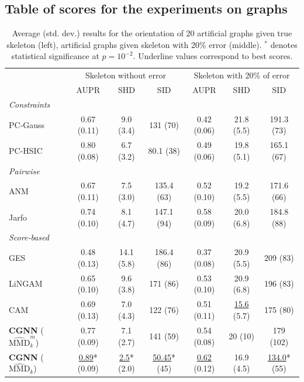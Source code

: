 \documentclass[a4paper, 11pt]{article}
\begin{document}
\subsection{Table of scores for the experiments on graphs}



\begin{table}[h!]
  \caption{Average (std. dev.) results for the orientation of 20 artificial graphs given true skeleton (left), artificial graphs given skeleton with 20\% error (middle). $^*$ denotes statistical significance at $p=10^{-2}$. Underline values correspond to best scores.}
  \footnotesize
  \hspace*{-1.5cm}
    \centering
  \begin{tabular}{l|ccc|ccc|}
    \toprule
     &  \multicolumn{3}{c}{Skeleton without error} & \multicolumn{3}{c}{Skeleton with 20\% of error} \\
      & AUPR & SHD & SID & AUPR & SHD & SID  \\
    \midrule
    \textit{Constraints}\\
    PC-Gauss & 0.67 (0.11) & 9.0 (3.4) & 131 (70) & 0.42 (0.06) & 21.8 (5.5) & 191.3 (73)  \\
    PC-HSIC & 0.80 (0.08) & 6.7 (3.2) & 80.1 (38) & 0.49 (0.06) & 19.8 (5.1) & 165.1 (67)  \\
    \midrule
    \textit{Pairwise}\\
    ANM & 0.67 (0.11) & 7.5 (3.0) & 135.4 (63) & 0.52 (0.10) & 19.2 (5.5) & 171.6  (66)  \\
    Jarfo & 0.74 (0.10)   & 8.1 (4.7) & 147.1 (94) & 0.58 (0.09) & 20.0 (6.8) & 184.8 (88) \\
    \midrule
    \textit{Score-based}\\
        GES & 0.48 (0.13) & 14.1 (5.8) & 186.4 (86) & 0.37 (0.08) & 20.9 (5.5) & 209 (83) \\ 
     LiNGAM & 0.65 (0.10) & 9.6 (3.8) & 171 (86) & 0.53 (0.10) & 20.9 (6.8) & 196 (83)  \\
     CAM & 0.69 (0.13)  & 7.0 (4.3) & 122 (76) & 0.51 (0.11) & \underline{15.6} (5.7) & 175 (80) \\    
    \textbf{CGNN} ($\widehat{\text{MMD}}^m_k$) & 0.77 (0.09) &  7.1 (2.7) &  141 (59) & 0.54 (0.08) & 20 (10) & 179 (102) \\
    \textbf{CGNN} ($\widehat{\text{MMD}}_k$) & \underline{0.89}* (0.09) & \underline{2.5}* (2.0) & \underline{50.45}* (45) & \underline{0.62} (0.12) & 16.9 (4.5) & \underline{134.0}* (55) \\
    \bottomrule
  \end{tabular}
   \hspace*{-2cm}
  \label{table:multi}
\end{table}
\end{document}

